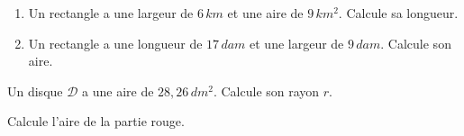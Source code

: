 \begin{pageParcourst}



\begin{enumerate}
\item Un rectangle a une largeur de $6\,km$ et une aire de $9\,km^2$. Calcule sa longueur.
\item Un rectangle a une longueur de $17\,dam$ et une largeur de $9\,dam$. Calcule son aire.
\end{enumerate}
 

 


Un disque $\mathcal{D}$ a une aire de $28,26\,dm^2$. Calcule son rayon $r$.
 



\begin{minipage}{0.58\linewidth}

Calcule l'aire de la partie rouge. 
\end{minipage}
\hfill
\begin{minipage}{0.38\linewidth}


\end{minipage}
\end{pageParcourst}
